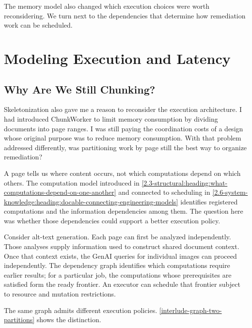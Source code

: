 
The memory model also changed which execution choices were worth reconsidering. We turn next to the dependencies that determine how remediation work can be scheduled.

\section{Modeling Execution and Latency}\label{heading:modeling-execution-and-latency}

\subsection{Why Are We Still Chunking?}\label{heading:why-are-we-still-chunking}

Skeletonization also gave me a reason to reconsider the execution architecture. I had introduced ChunkWorker to limit memory consumption by dividing documents into page ranges. I was still paying the coordination costs of a design whose original purpose was to reduce memory consumption. With that problem addressed differently, was partitioning work by page still the best way to organize remediation?

A page tells us where content occurs, not which computations depend on which others. The computation model introduced in \autoref{2.3-structural:heading:what-computations-depend-on-one-another} and connected to scheduling in \autoref{2.6-system-knowledge:heading:docable-connecting-engineering-models} identifies registered computations and the information dependencies among them. The question here was whether those dependencies could support a better execution policy.

Consider alt-text generation. Each page can first be analyzed independently. Those analyses supply information used to construct shared document context. Once that context exists, the GenAI queries for individual images can proceed independently. The dependency graph identifies which computations require earlier results; for a particular job, the computations whose prerequisites are satisfied form the ready frontier. An executor can schedule that frontier subject to resource and mutation restrictions.

The same graph admits different execution policies. \autoref{interlude-graph-two-partitions} shows the distinction.

